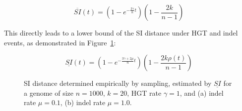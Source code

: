 \documentclass[9pt,english,utf8]{article}
\begin{document}
\begin{equation}
    \overline{SI}(t) = \left(1-e^{-\frac{3\gamma}{n}t}\right)
    \left(1-\frac{2k}{n-1}\right)
\end{equation}

This directly leads to a lower bound of the SI distance under HGT and indel
events, as demonstrated in Figure~\ref{fig:si_distance_hgtindel}:

\begin{equation}
    \underline{SI}(t) = \left(1-e^{-\frac{3\gamma+2\mu}{n}t}\right)
    \left(1-\frac{2k\rho(t)}{n-1}\right)
\end{equation}

\begin{figure}[tb]
    \centering 
    \caption{SI distance determined empirically by sampling, estimated by 
    $\underline{SI}$ for a genome of size $n=1000$, $k=20$, HGT rate $\gamma=1$,
    and (a) indel rate $\mu=0.1$, (b) indel rate $\mu=1.0$.  }
    \label{fig:si_distance_hgtindel}
\end{figure}
\end{document}
